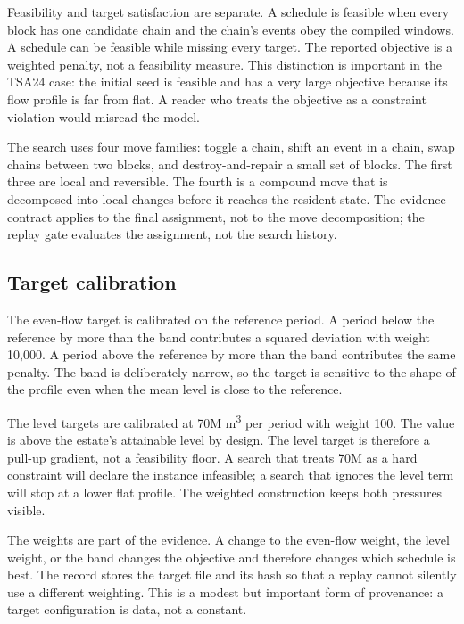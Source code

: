 \documentclass[11pt]{article}
\begin{document}
Feasibility and target satisfaction are separate. A schedule is feasible when every block has one
candidate chain and the chain's events obey the compiled windows. A schedule can be feasible while
missing every target. The reported objective is a weighted penalty, not a feasibility measure. This
distinction is important in the TSA24 case: the initial seed is feasible and has a very large
objective because its flow profile is far from flat. A reader who treats the objective as a
constraint violation would misread the model.

The search uses four move families: toggle a chain, shift an event in a chain, swap chains between
two blocks, and destroy-and-repair a small set of blocks. The first three are local and reversible.
The fourth is a compound move that is decomposed into local changes before it reaches the resident
state. The evidence contract applies to the final assignment, not to the move decomposition; the
replay gate evaluates the assignment, not the search history.

\subsection{Target calibration}

The even-flow target is calibrated on the reference period. A period below the reference by more than
the band contributes a squared deviation with weight 10,000. A period above the reference by more
than the band contributes the same penalty. The band is deliberately narrow, so the target is
sensitive to the shape of the profile even when the mean level is close to the reference.

The level targets are calibrated at 70M m\textsuperscript{3} per period with weight 100. The value is
above the estate's attainable level by design. The level target is therefore a pull-up gradient, not
a feasibility floor. A search that treats 70M as a hard constraint will declare the instance
infeasible; a search that ignores the level term will stop at a lower flat profile. The weighted
construction keeps both pressures visible.

The weights are part of the evidence. A change to the even-flow weight, the level weight, or the band
changes the objective and therefore changes which schedule is best. The record stores the target file
and its hash so that a replay cannot silently use a different weighting. This is a modest but
important form of provenance: a target configuration is data, not a constant.
\end{document}
